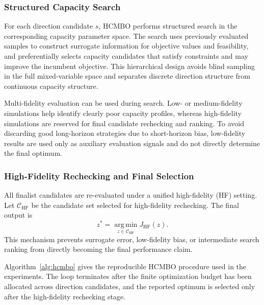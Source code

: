 \documentclass[lettersize,journal]{IEEEtran}
\begin{document}
\subsubsection{Structured Capacity Search}

For each direction candidate $s$, HCMBO performs structured search in the corresponding capacity parameter space.
The search uses previously evaluated samples to construct surrogate information for objective values and feasibility, and preferentially selects capacity candidates that satisfy constraints and may improve the incumbent objective.
This hierarchical design avoids blind sampling in the full mixed-variable space and separates discrete direction structure from continuous capacity structure.

Multi-fidelity evaluation can be used during search.
Low- or medium-fidelity simulations help identify clearly poor capacity profiles, whereas high-fidelity simulations are reserved for final candidate rechecking and ranking.
To avoid discarding good long-horizon strategies due to short-horizon bias, low-fidelity results are used only as auxiliary evaluation signals and do not directly determine the final optimum.

\subsubsection{High-Fidelity Rechecking and Final Selection}

All finalist candidates are re-evaluated under a unified high-fidelity (HF) setting.
Let $\mathcal C_{\mathrm{HF}}$ be the candidate set selected for high-fidelity rechecking.
The final output is
\begin{equation}
z^*=\operatorname*{arg\,min}_{z\in\mathcal C_{\mathrm{HF}}}J_{\mathrm{HF}}(z).
\label{eq:hcmbo_final}
\end{equation}
This mechanism prevents surrogate error, low-fidelity bias, or intermediate search ranking from directly becoming the final performance claim.

Algorithm~\ref{alg:hcmbo} gives the reproducible HCMBO procedure used in the experiments.
The loop terminates after the finite optimization budget has been allocated across direction candidates, and the reported optimum is selected only after the high-fidelity rechecking stage.
\end{document}
